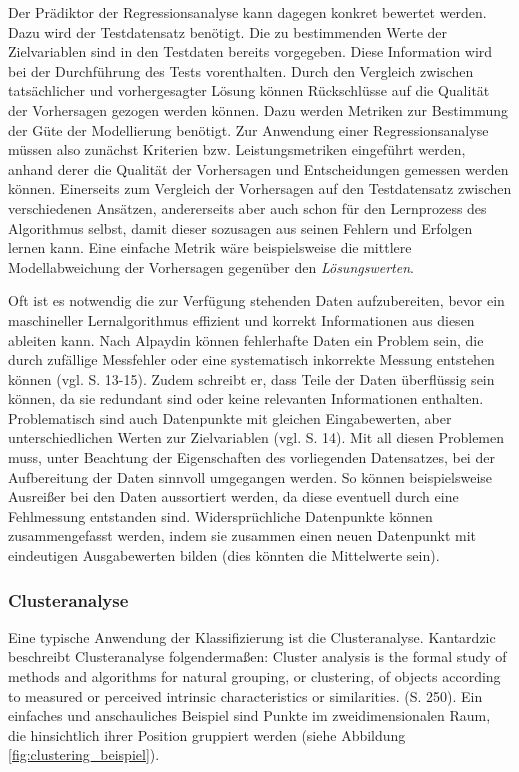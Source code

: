 \documentclass[
	12pt,
	a4paper,
	BCOR10mm,
	DIV14,
	listof=totoc,
	bibliography=totoc,
	headsepline
]{scrreprt}
\begin{document}
Der Prädiktor der Regressionsanalyse kann dagegen konkret bewertet werden. Dazu wird der Testdatensatz benötigt. Die zu bestimmenden Werte der Zielvariablen sind in den Testdaten bereits vorgegeben.
Diese Information wird bei der Durchführung des Tests vorenthalten. Durch den Vergleich zwischen tatsächlicher und vorhergesagter Lösung können Rückschlüsse auf die Qualität der Vorhersagen gezogen werden können. Dazu werden Metriken zur Bestimmung der Güte der Modellierung benötigt.
Zur Anwendung einer Regressionsanalyse müssen also zunächst Kriterien bzw. Leistungsmetriken eingeführt werden, anhand derer die Qualität der Vorhersagen und Entscheidungen gemessen werden können. Einerseits zum Vergleich der Vorhersagen auf den Testdatensatz zwischen verschiedenen Ansätzen, andererseits aber auch schon für den Lernprozess des Algorithmus selbst, damit dieser sozusagen aus seinen Fehlern und Erfolgen lernen kann. Eine einfache Metrik wäre beispielsweise die mittlere Modellabweichung der Vorhersagen gegenüber den \textit{Lösungswerten}.
\medskip

Oft ist es notwendig die zur Verfügung stehenden Daten aufzubereiten, bevor ein maschineller Lernalgorithmus effizient und korrekt Informationen aus diesen ableiten kann.
Nach Alpaydin können fehlerhafte Daten ein Problem sein, die durch zufällige Messfehler oder eine systematisch inkorrekte Messung entstehen können (vgl. \cite{Alpaydin:2010:IML:1734076} S. 13-15). Zudem schreibt er, dass Teile der Daten überflüssig sein können, da sie redundant sind oder keine relevanten Informationen enthalten. Problematisch sind auch Datenpunkte mit gleichen Eingabewerten, aber unterschiedlichen Werten zur Zielvariablen (vgl. \cite{Alpaydin:2010:IML:1734076} S. 14).
Mit all diesen Problemen muss, unter Beachtung der Eigenschaften des vorliegenden Datensatzes, bei der Aufbereitung der Daten sinnvoll umgegangen werden. So können beispielsweise Ausreißer bei den Daten aussortiert werden, da diese eventuell durch eine Fehlmessung entstanden sind. Widersprüchliche Datenpunkte können zusammengefasst werden, indem sie zusammen einen neuen Datenpunkt mit eindeutigen Ausgabewerten bilden (dies könnten die Mittelwerte sein).

\subsubsection{Clusteranalyse}
Eine typische Anwendung der Klassifizierung ist die Clusteranalyse.
Kantardzic beschreibt Clusteranalyse folgendermaßen: \glqq Cluster analysis is the formal study of methods and algorithms for natural grouping, or clustering, of objects according to measured or perceived intrinsic characteristics or similarities.\grqq{} \cite{kantardzic2011data} (S. 250). Ein einfaches und anschauliches Beispiel sind Punkte im zweidimensionalen Raum, die hinsichtlich ihrer Position gruppiert werden (siehe Abbildung \ref{fig:clustering_beispiel}).
\end{document}
